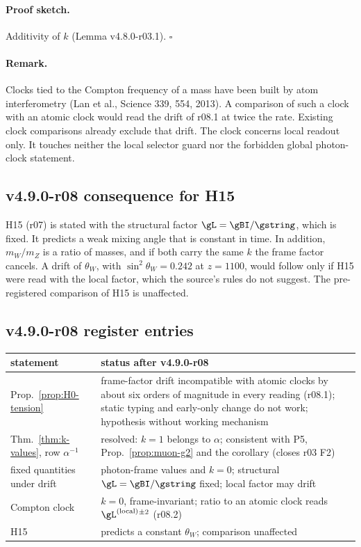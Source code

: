 \paragraph{Proof sketch.}
Additivity of \(k\) (Lemma v4.8.0-r03.1).  \(\square\)

\paragraph{Remark.}
Clocks tied to the Compton frequency of a mass have been built by atom interferometry (Lan et al., Science 339, 554, 2013).
A comparison of such a clock with an atomic clock would read the drift of r08.1 at twice the rate.  Existing clock
comparisons already exclude that drift.  The clock concerns local readout only.  It touches neither the local selector
guard nor the forbidden global photon-clock statement.

\subsection*{v4.9.0-r08 consequence for H15}
\label{subsec:v490-r08-h15}

H15 (r07) is stated with the structural factor \(\gL=\gBI/\gstring\), which is fixed.  It predicts a weak mixing angle that
is constant in time.  In addition, \(m_W/m_Z\) is a ratio of masses, and if both carry the same \(k\) the frame factor
cancels.  A drift of \(\theta_W\), with \(\sin^2\theta_W=0.242\) at \(z=1100\), would follow only if H15 were read with the
local factor, which the source's rules do not suggest.  The pre-registered comparison of H15 is unaffected.

\subsection*{v4.9.0-r08 register entries}
\label{subsec:v490-r08-register}

\begin{center}
\small
\begin{tabular}{@{}>{\raggedright\arraybackslash}p{}>{\raggedright\arraybackslash}p{}@{}}
\toprule
statement & status after v4.9.0-r08\\
\midrule
Prop.~\ref{prop:H0-tension} & frame-factor drift incompatible with atomic clocks by about six orders of magnitude in every reading (r08.1); static typing and early-only change do not work; hypothesis without working mechanism\\
Thm.~\ref{thm:k-values}, row \(\alpha^{-1}\) & resolved: \(k=1\) belongs to \(\alpha\); consistent with P5, Prop.~\ref{prop:muon-g2} and the corollary (closes r03 F2)\\
fixed quantities under drift & photon-frame values and \(k=0\); structural \(\gL=\gBI/\gstring\) fixed; local factor may drift\\
Compton clock & \(k=0\), frame-invariant; ratio to an atomic clock reads \(\gL^{(\mathrm{local})}{}^{\pm2}\) (r08.2)\\
H15 & predicts a constant \(\theta_W\); comparison unaffected\\
\bottomrule
\end{tabular}
\end{center}

